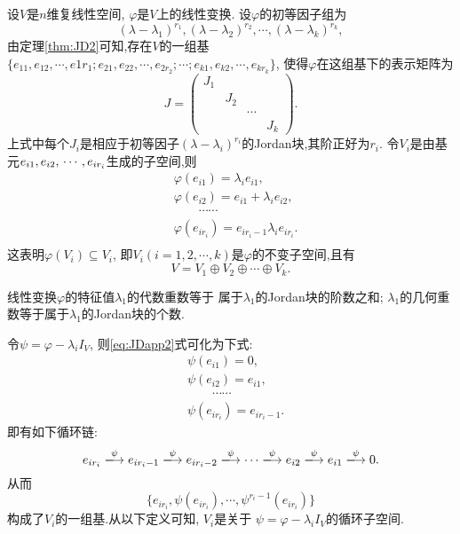 设$V$是$n$维复线性空间, $\varphi$是$V$上的线性变换.
设$\varphi$的初等因子组为
\begin{equation}\label{eq:JDapp1}
  (\lambda-\lambda_1)^{r_1},(\lambda-\lambda_2)^{r_2},\cdots,
  (\lambda-\lambda_k)^{r_k},
\end{equation}
由定理\ref{thm:JD2}可知,存在$V$的一组基
$\{e_{11},e_{12},\cdots,e{1r_1};e_{21},e_{22},\cdots,e_{2r_2};\cdots;e_{k1},e_{k2},\cdots,e_{kr_k}\}$,
使得$\varphi$在这组基下的表示矩阵为
\[J=
  \begin{pmatrix}
    J_1&&&\\
       &J_2&&\\
       &&\cdots&\\
    &&&J_k
  \end{pmatrix}.\]
上式中每个$J_i$是相应于初等因子$(\lambda-\lambda_i)^{r_i}$的Jordan块,其阶正好为$r_i$.
令$V_i$是由基元$e_{i1}, e_{i2},\\ \cdots, e_{ir_i}$生成的子空间,则
\begin{equation}\label{eq:JDapp2}
  \begin{split}
   & \varphi(e_{i1})  = \lambda_ie_{i1},\\
   & \varphi(e_{i2})  = e_{i1}+\lambda_ie_{i2},\\
                   &\hspace{2em} \cdots\cdots\\
   & \varphi(e_{ir_i})  = e_{ir_i-1}\lambda_ie_{ir_i}.\\
  \end{split}
\end{equation}
这表明$\varphi(V_i)\subseteq V_i$,
即$V_i(i=1,2,\cdots,k)$是$\varphi$的不变子空间,且有
\[V=V_1\oplus V_2 \oplus\cdots\oplus V_k.\]

\begin{theorem}
  线性变换$\varphi$的特征值$\lambda_1$的代数重数等于
  属于$\lambda_1$的Jordan块的阶数之和;
  $\lambda_1$的几何重数等于属于$\lambda_1$的Jordan块的个数.
\end{theorem}

令$\psi=\varphi-\lambda_i I_V$,
则\eqref{eq:JDapp2}式可化为下式:
\begin{equation}\label{eq:JDapp3}
  \begin{split}
    & \psi(e_{i1})=0,\\
    & \psi(e_{i2})=e_{i1},\\
    & \hspace{2em} \cdots\cdots\\
    & \psi(e_{ir_i})=e_{ir_i-1}.
  \end{split}
\end{equation}
即有如下循环链:
\[e_{ir_i} \xlongrightarrow {\psi} e_{ir_i-1} \xlongrightarrow {\psi}
  e_{ir_i-2} \xlongrightarrow {\psi} \cdots \xlongrightarrow {\psi}
  e_{i2} \xlongrightarrow {\psi} e_{i1} \xlongrightarrow {\psi} 0.\]
从而
\[\{e_{ir_i},\psi(e_{ir_i}),\cdots,\psi^{r_i-1}(e_{ir_i})\}\]
构成了$V_i$的一组基.从以下定义可知, $V_i$是关于
$\psi=\varphi-\lambda_i I_V$的循环子空间.


